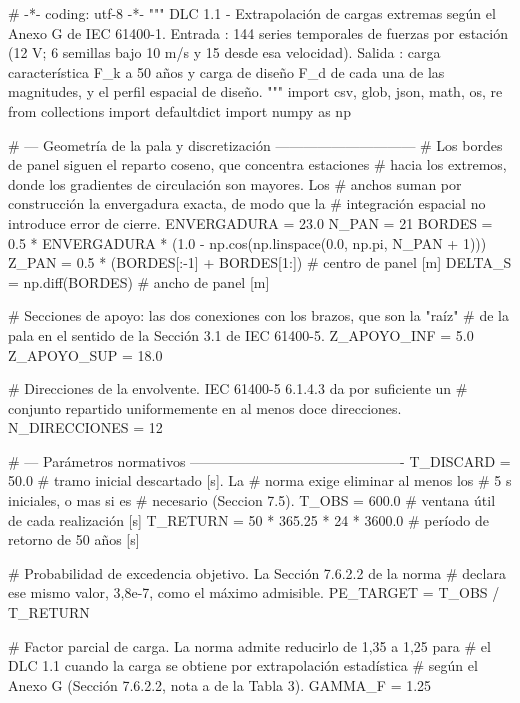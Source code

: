\begin{pycode}
# -*- coding: utf-8 -*-
"""
DLC 1.1 - Extrapolación de cargas extremas según el Anexo G de IEC 61400-1.
Entrada : 144 series temporales de fuerzas por estación (12 V; 6 semillas
          bajo 10 m/s y 15 desde esa velocidad).
Salida  : carga característica F_k a 50 años y carga de diseño F_d de cada
          una de las magnitudes, y el perfil espacial de diseño.
"""
import csv, glob, json, math, os, re
from collections import defaultdict
import numpy as np

# --- Geometría de la pala y discretización ------------------------------
# Los bordes de panel siguen el reparto coseno, que concentra estaciones
# hacia los extremos, donde los gradientes de circulación son mayores. Los
# anchos suman por construcción la envergadura exacta, de modo que la
# integración espacial no introduce error de cierre.
ENVERGADURA = 23.0
N_PAN   = 21
BORDES  = 0.5 * ENVERGADURA * (1.0 - np.cos(np.linspace(0.0, np.pi, N_PAN + 1)))
Z_PAN   = 0.5 * (BORDES[:-1] + BORDES[1:])   # centro de panel [m]
DELTA_S = np.diff(BORDES)                    # ancho de panel [m]

# Secciones de apoyo: las dos conexiones con los brazos, que son la "raíz"
# de la pala en el sentido de la Sección 3.1 de IEC 61400-5.
Z_APOYO_INF = 5.0
Z_APOYO_SUP = 18.0

# Direcciones de la envolvente. IEC 61400-5 6.1.4.3 da por suficiente un
# conjunto repartido uniformemente en al menos doce direcciones.
N_DIRECCIONES = 12

# --- Parámetros normativos ----------------------------------------------
T_DISCARD = 50.0                       # tramo inicial descartado [s]. La
                                       # norma exige eliminar al menos los
                                       # 5 s iniciales, o mas si es
                                       # necesario (Seccion 7.5).
T_OBS     = 600.0                      # ventana útil de cada realización [s]
T_RETURN  = 50 * 365.25 * 24 * 3600.0  # período de retorno de 50 años [s]

# Probabilidad de excedencia objetivo. La Sección 7.6.2.2 de la norma
# declara ese mismo valor, 3,8e-7, como el máximo admisible.
PE_TARGET = T_OBS / T_RETURN

# Factor parcial de carga. La norma admite reducirlo de 1,35 a 1,25 para
# el DLC 1.1 cuando la carga se obtiene por extrapolación estadística
# según el Anexo G (Sección 7.6.2.2, nota a de la Tabla 3).
GAMMA_F = 1.25
\end{pycode}

